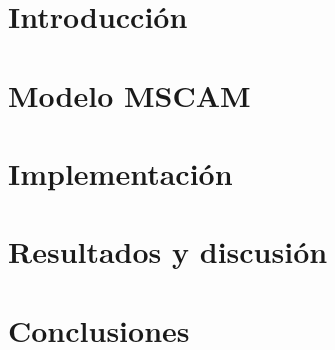 \documentclass[11pt,a4paper]{article}
\begin{document}



\section{Introducción}
\label{sec:introduction}


\section{Modelo MSCAM}
\label{sec:model}


\section{Implementación}
\label{sec:impl}


\section{Resultados y discusión}
\label{sec:results}


\section{Conclusiones}
\label{sec:conclusions}

\end{document}
